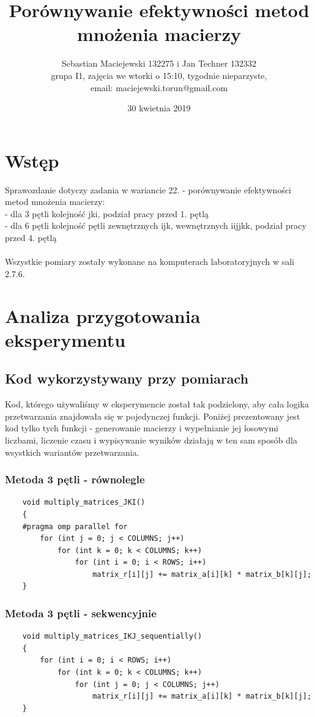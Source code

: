 \documentclass[10pt,a4paper]{article}
\author{Sebastian Maciejewski 132275 i Jan Techner 132332\\
grupa I1, zajęcia we wtorki o 15:10, tygodnie nieparzyste,\\
email: maciejewski.torun@gmail.com}
\title{Porównywanie efektywności metod mnożenia macierzy}
\date{30 kwietnia 2019}
\begin{document}
\maketitle
\section{Wstęp}
Sprawozdanie dotyczy zadania w wariancie 22. - porównywanie efektywności metod
mnożenia macierzy:\\
- dla 3 pętli kolejność jki, podział pracy przed 1. pętlą\\
- dla 6 pętli kolejność pętli zewnętrznych ijk, wewnętrznych iijjkk,
podział pracy przed 4. pętlą\\
\\
Wszystkie pomiary zostały wykonane na komputerach laboratoryjnych w sali 2.7.6.
\section{Analiza przygotowania eksperymentu}
\subsection{Kod wykorzystywany przy pomiarach}
Kod, którego używaliśmy w eksperymencie został tak podzielony, aby cała
logika przetwarzania znajdowała się w pojedynczej funkcji. Poniżej prezentowany
jest kod tylko tych funkcji - generowanie macierzy i wypełnianie jej
losowymi liczbami, liczenie czasu i wypisywanie wyników działają w ten
sam sposób dla wsystkich wariantów przetwarzania.
\subsubsection{Metoda 3 pętli - równolegle}
\begin{lstlisting}
    void multiply_matrices_JKI()
    {
    #pragma omp parallel for 
        for (int j = 0; j < COLUMNS; j++)
            for (int k = 0; k < COLUMNS; k++)
                for (int i = 0; i < ROWS; i++)
                    matrix_r[i][j] += matrix_a[i][k] * matrix_b[k][j];
    }
\end{lstlisting}

\subsubsection{Metoda 3 pętli - sekwencyjnie}
\begin{lstlisting}
    void multiply_matrices_IKJ_sequentially() 
    {
        for (int i = 0; i < ROWS; i++)
            for (int k = 0; k < COLUMNS; k++)   
                for (int j = 0; j < COLUMNS; j++)
                    matrix_r[i][j] += matrix_a[i][k] * matrix_b[k][j];
    }
\end{lstlisting}
\end{document}
